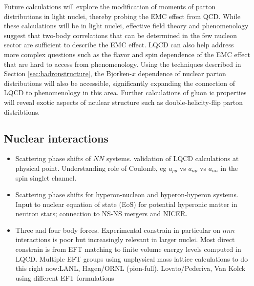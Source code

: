 Future calculations will explore the modification of moments of parton distributions in light nuclei, thereby probing the EMC effect from QCD. While these calculations will be in light nuclei, effective field theory \cite{Chen:2004zx,Chen:2016bde} and phenomenology \cite{Hen:2016kwk} suggest that two-body correlations that can be determined in the few nucleon sector are sufficient to describe the EMC effect. LQCD can also help address more complex questions such as the flavor and spin dependence of the EMC effect that are hard to access from phenomenology. Using the techniques described in Section \ref{sec:hadronstructure}, the Bjorken-$x$ dependence of nuclear parton distributions will also be accessible, significantly expanding the connection of LQCD to phenomenology in this area. Further calculations of gluon ic properties will reveal exotic aspects of nculear structure such as double-helicity-flip parton distribtions.






\subsection{Nuclear interactions}

\begin{itemize}
	\item Scattering  phase shifts of $NN$ systems. validation of LQCD calculations at physical point. Understanding role of Coulomb, eg $a_{pp}$ vs $a_{np}$ vs $a_{nn}$ in the spin singlet channel.
	\item Scattering phase shifts for  hyperon-nucleon and hyperon-hyperon systems. Input to nuclear equation of state (EoS) for potential hyperonic matter in neutron stars; connection to NS-NS mergers and NICER.
	\item Three and four body forces. Experimental constrain in particular on $nnn$ interactions is poor but increasingly relevant in larger nuclei. Most direct constrain is from EFT matching to finite volume energy levels computed in LQCD. Multiple EFT groups using unphysical mass lattice calculations to do this right now:LANL, Hagen/ORNL (pion-full), Lovato/Pederiva, Van Kolck using different EFT formulations

\end{itemize}


